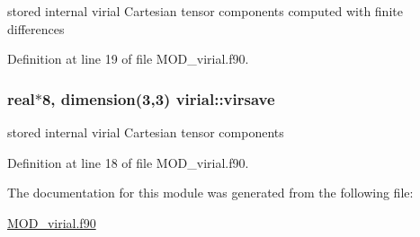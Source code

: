 stored internal virial Cartesian tensor components computed with finite differences 



Definition at line 19 of file M\-O\-D\-\_\-virial.\-f90.

\hypertarget{classvirial_a663e5aebd9b992869ea30af389ef32e2}{
\subsubsection[{virsave}]{\setlength{\rightskip}{0pt plus 5cm}real$\ast$8, dimension(3,3) virial\-::virsave}}\label{classvirial_a663e5aebd9b992869ea30af389ef32e2}


stored internal virial Cartesian tensor components 



Definition at line 18 of file M\-O\-D\-\_\-virial.\-f90.



The documentation for this module was generated from the following file\-:\begin{DoxyCompactItemize}
\item 
\hyperlink{MOD__virial_8f90}{M\-O\-D\-\_\-virial.\-f90}\end{DoxyCompactItemize}
